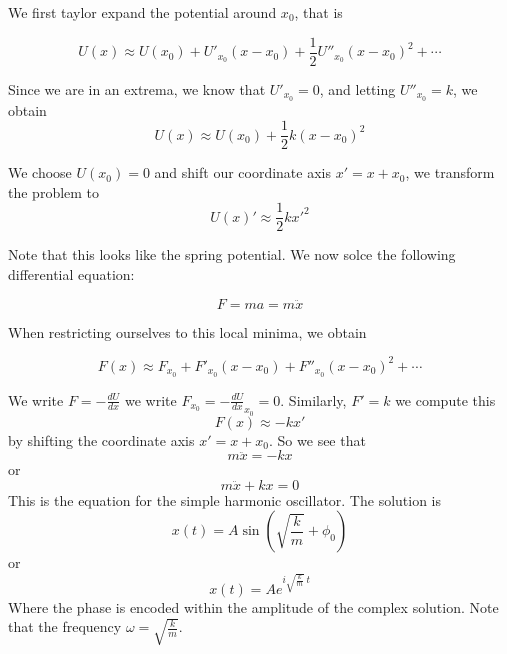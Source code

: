 \documentclass{article}
\newtheorem{one minute paper}[theorem]{One Minute Paper}
\begin{document}
We first taylor expand the potential around $x_0$, that is

\begin{equation}
    U(x) \approx U(x_0) + U'_{x_0}(x-x_0) + \frac{1}{2}U''_{x_0}(x-x_0)^2 + \cdots
\end{equation}

Since we are in an extrema, we know that $U'_{x_0} = 0$, and letting $U''_{x_0} = k$, we obtain
\begin{equation}
    U(x) \approx U(x_0) + \frac{1}{2}k(x-x_0)^2
\end{equation}

We choose $U(x_0) = 0$ and shift our coordinate axis $x' = x + x_0$, we transform the problem to 
\begin{equation}
    U(x)' \approx \frac{1}{2}kx'^2
\end{equation}

Note that this looks like the spring potential. We now solce the following differential equation:

\begin{equation}
    F = ma = m\ddot{x}
\end{equation}


\begin{center}
\end{center}

When restricting ourselves to this local minima, we obtain

\begin{equation}
    F(x) \approx F_{x_0} + F'_{x_0}(x-x_0) + F''_{x_0}(x-x_0)^2 + \cdots
\end{equation}

We write $F = -\frac{dU}{dx}$ we write $F_{x_0} = -\frac{dU}{dx}_{x_0} = 0$. Similarly, $F' = k$ we compute this 
\begin{equation}
    F(x) \approx -kx'
\end{equation}
by shifting the coordinate axis $x' = x + x_0$. So we see that
\begin{equation}
    m\ddot{x} = -kx
\end{equation}
or 
\begin{equation}
    m\ddot{x} + kx = 0
\end{equation}
This is the equation for the simple harmonic oscillator. The solution is
\begin{equation}
    x(t) = A\sin(\sqrt{\frac{k}{m}} + \phi_0)
\end{equation}
or 
\begin{equation}
    x(t) = Ae^{i \sqrt{\frac{k}{m}} \ t}
\end{equation}
Where the phase is encoded within the amplitude of the complex solution. Note that the frequency $\omega = \sqrt{\frac{k}{m}}$. 
\end{document}
